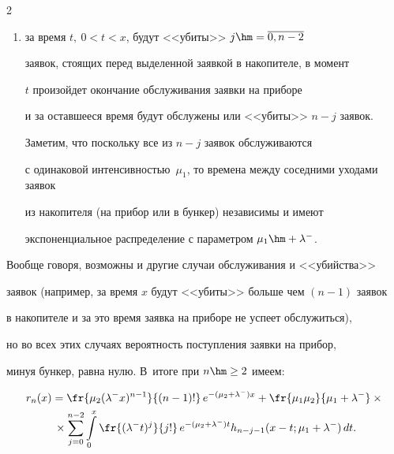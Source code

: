 \begin{multicols}{2}
\begin{enumerate}[(1)]
а окончание обслуживания заявки на приборе произойдет


в промежутке $(x,x+dx)$;





\item за время $t, \ 0<t<x$, будут <<убиты>> $j\hm=\overline{0,n-2}$


заявок, стоящих перед выделенной заявкой в накопителе, в момент


$t$ произойдет окончание обслуживания заявки на приборе


и за оставшееся время будут обслужены или <<убиты>> $n-j$ заявок.


Заметим, что поскольку все из $n-j$ заявок обслуживаются


с одинаковой интенсивностью~$\mu_1$, то времена между соседними уходами заявок


из накопителя (на прибор или в бункер) независимы и имеют


экспоненциальное распределение с параметром $\mu_1\hm+\lambda^-$.


\end{enumerate}





Вообще говоря, возможны и другие случаи обслуживания и <<убийства>>


заявок (например, за время $x$ будут <<убиты>> больше чем $(n-1)$ заявок


в накопителе и за это время заявка на приборе не успеет обслужиться),


но во всех этих случаях вероятность поступления заявки на прибор,


минуя бункер, равна нулю. В~итоге при $n \hm\ge 2$ имеем:


\begin{multline*}


r_n(x)=\fr{\mu_2(\lambda^- x)^{n-1}}{(n-1)!}\, e^{-(\mu_2+\lambda^-) x}


+ \fr{ \mu_1 \mu_2}{\mu_1+\lambda^-}\times{}\\


{}\times


\sum\limits_{j=0}^{n-2} \int\limits_{0}^{x} \fr{(\lambda^- t)^{j}}{ j!}\, e^{-(\mu_2+\lambda^-) t}


h_{n-j-1}(x-t;\mu_1+\lambda^-) \,dt.


\end{multline*}






\end{multicols}
